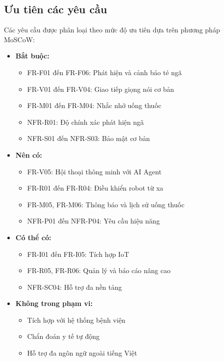\subsection{Ưu tiên các yêu cầu}

Các yêu cầu được phân loại theo mức độ ưu tiên dựa trên phương pháp MoSCoW:

\begin{itemize}
    \item \textbf{Bắt buộc:}
    \begin{itemize}
        \item FR-F01 đến FR-F06: Phát hiện và cảnh báo té ngã
        \item FR-V01 đến FR-V04: Giao tiếp giọng nói cơ bản
        \item FR-M01 đến FR-M04: Nhắc nhở uống thuốc
        \item NFR-R01: Độ chính xác phát hiện ngã
        \item NFR-S01 đến NFR-S03: Bảo mật cơ bản
    \end{itemize}
    
    \item \textbf{Nên có:}
    \begin{itemize}
        \item FR-V05: Hội thoại thông minh với AI Agent
        \item FR-R01 đến FR-R04: Điều khiển robot từ xa
        \item FR-M05, FR-M06: Thông báo và lịch sử uống thuốc
        \item NFR-P01 đến NFR-P04: Yêu cầu hiệu năng
    \end{itemize}
    
    \item \textbf{Có thể có:}
    \begin{itemize}
        \item FR-I01 đến FR-I05: Tích hợp IoT
        \item FR-R05, FR-R06: Quản lý và báo cáo nâng cao
        \item NFR-SC04: Hỗ trợ đa nền tảng
    \end{itemize}
    
    \item \textbf{Không trong phạm vi:}
    \begin{itemize}
        \item Tích hợp với hệ thống bệnh viện
        \item Chẩn đoán y tế tự động
        \item Hỗ trợ đa ngôn ngữ ngoài tiếng Việt
    \end{itemize}
\end{itemize}
